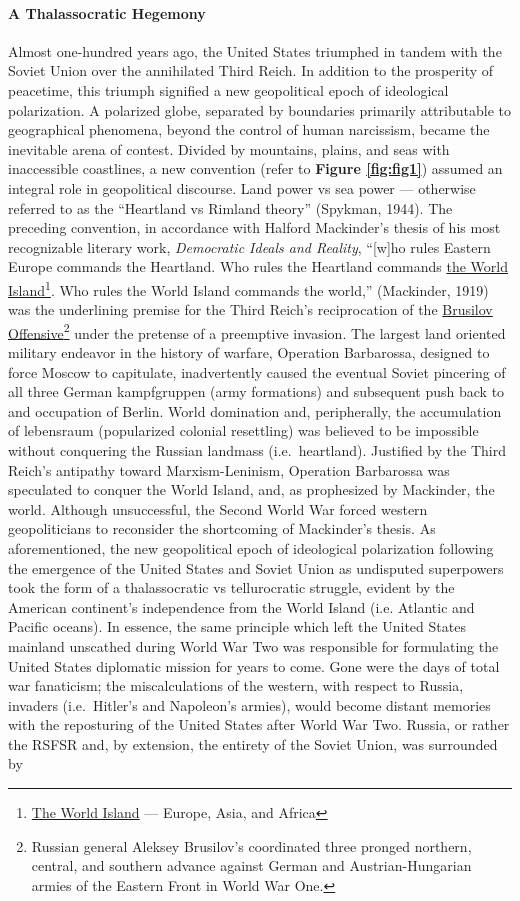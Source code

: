 \documentclass[12pt]{article}
\begin{document}
\paragraph{A Thalassocratic Hegemony} Almost one-hundred years ago, the United States triumphed in tandem with the Soviet Union over the annihilated Third Reich. In addition to the prosperity of peacetime, this triumph signified a new geopolitical epoch of ideological polarization. A polarized globe, separated by boundaries primarily attributable to geographical phenomena, beyond the control of human narcissism, became the inevitable arena of contest. Divided by mountains, plains, and seas with inaccessible coastlines, a new convention (refer to \textbf{Figure \ref{fig:fig1}}) assumed an integral role in geopolitical discourse. Land power vs sea power — otherwise referred to as the “Heartland vs Rimland theory” (Spykman, 1944). The preceding convention, in accordance with Halford Mackinder's thesis of his most recognizable literary work, \emph{Democratic Ideals and Reality}, “[w]ho rules Eastern Europe commands the Heartland. Who rules the Heartland commands \underline{the World Island}\footnote{\underline{The World Island} — Europe, Asia, and Africa}. Who rules the World Island commands the world,” (Mackinder, 1919) was the underlining premise for the Third Reich's reciprocation of the \underline{Brusilov Offensive}\footnote{Russian general Aleksey Brusilov's coordinated three pronged northern, central, and southern advance against German and Austrian-Hungarian armies of the Eastern Front in World War One.} under the pretense of a preemptive invasion. The largest land oriented military endeavor in the history of warfare, Operation Barbarossa, designed to force Moscow to capitulate, inadvertently caused the eventual Soviet pincering of all three German kampfgruppen (army formations) and subsequent push back to and occupation of Berlin. World domination and, peripherally, the accumulation of lebensraum (popularized colonial resettling) was believed to be impossible without conquering the Russian landmass (i.e.\ heartland). Justified by the Third Reich's antipathy toward Marxism-Leninism, Operation Barbarossa was speculated to conquer the World Island, and, as prophesized by Mackinder, the world. Although unsuccessful, the Second World War forced western geopoliticians to reconsider the shortcoming of Mackinder's thesis. As aforementioned, the new geopolitical epoch of ideological polarization following the emergence of the United States and Soviet Union as undisputed superpowers took the form of a thalassocratic vs tellurocratic struggle, evident by the American continent's independence from the World Island (i.e. Atlantic and Pacific oceans). In essence, the same principle which left the United States mainland unscathed during World War Two was responsible for formulating the United States diplomatic mission for years to come. Gone were the days of total war fanaticism; the miscalculations of the western, with respect to Russia, invaders (i.e.\ Hitler's and Napoleon's armies), would become distant memories with the reposturing of the United States after World War Two. Russia, or rather the RSFSR and, by extension, the entirety of the Soviet Union, was surrounded by 
\end{document}
